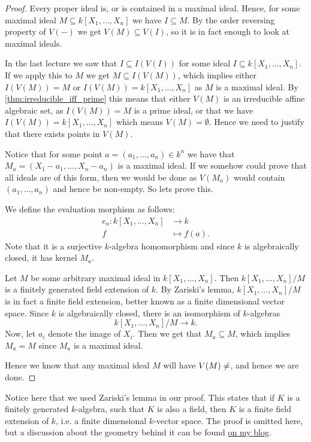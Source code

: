 \begin{proof}
Every proper ideal is, or is contained in a maximal ideal. Hence, for some maximal ideal $M\subseteq k[X_1, \ldots, X_n]$ we have $I\subseteq M$. By the order reversing property of $V(-)$ we get $V(M)\subseteq V(I)$, so it is in fact enough to look at maximal ideals. 

In the last lecture we saw that $I\subseteq I(V(I))$ for some ideal $I\subseteq k[X_1, \ldots, X_n]$. If we apply this to $M$ we get $M\subseteq I(V(M))$, which implies either $I(V(M))=M$ or $I(V(M))=k[X_1, \ldots, X_n]$ as $M$ is a maximal ideal. By \cref{thm:irreducible_iff_prime} this means that either $V(M)$ is an irreducible affine algebraic set, as $I(V(M))=M$ is a prime ideal, or that we have $I(V(M))=k[X_1, \ldots, X_n]$ which means $V(M)=\emptyset$. Hence we need to justify that there exists points in $V(M)$. 

Notice that for some point $a=(a_1, \ldots, a_n)\in k^n$ we have that $M_a=(X_1-a_1, \ldots, X_n-a_n)$ is a maximal ideal. If we somehow could prove that all ideals are of this form, then we would be done as $V(M_a)$ would contain $(a_1, \ldots, a_n)$ and hence be non-empty. So lets prove this. 

We define the evaluation morphism as follows: 
\begin{align*}
    e_{a}: k[X_1,\ldots, X_n]&\longrightarrow k \\
    f &\longmapsto f(a) .
\end{align*}
Note that it is a surjective $k$-algebra homomorphism and since $k$ is algebraically closed, it has kernel $M_{a}$. 

Let $M$ be some arbitrary maximal ideal in $k[X_1, \ldots, X_n]$. Then $k[X_1, \ldots, X_n]/M$ is a finitely generated field extension of $k$. By Zariski's lemma, $k[X_1, \ldots, X_n]/M$ is in fact a finite field extension, better known as a finite dimensional vector space. Since $k$ is algebraically closed, there is an isomorphism of $k$-algebras
\begin{equation*}
    k[X_1, \ldots,X_n]/M\longrightarrow k .
\end{equation*}
Now, let $a_i$ denote the image of $X_i$. Then we get that $M_{a}\subseteq M$, which implies $M_{a} = M$ since $M_{a}$ is a maximal ideal. 

Hence we know that any maximal ideal $M$ will have $V(M)\neq \empty$, and hence we are done. 
\end{proof}

Notice here that we used Zariski's lemma in our proof. This states that if $K$ is a finitely generated $k$-algebra, such that $K$ is also a field, then $K$ is a finite field extension of $k$, i.e. a finite dimensional $k$-vector space. The proof is omitted here, but a discussion about the geometry behind it can be found \href{https://aamathematics.wordpress.com/2020/05/13/more-geometric-intuition/}{{\color{blue}on my blog}}. 

